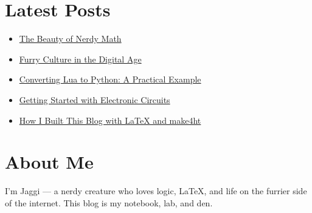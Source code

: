 \documentclass{article}
\begin{document}
\section*{Latest Posts}

\begin{itemize}
  \item \href{posts/article-template.html}{The Beauty of Nerdy Math}
  \item \href{posts/furry-culture.html}{Furry Culture in the Digital Age}
  \item \href{posts/lua-to-python.html}{Converting Lua to Python: A Practical Example}
  \item \href{posts/electronic-circuits.html}{Getting Started with Electronic Circuits}
  \item \href{posts/latex-make4ht.html}{How I Built This Blog with LaTeX and make4ht}
\end{itemize}

\section*{About Me}

I'm Jaggi — a nerdy creature who loves logic, LaTeX, and life on the furrier side of the internet. This blog is my notebook, lab, and den.
\end{document}
